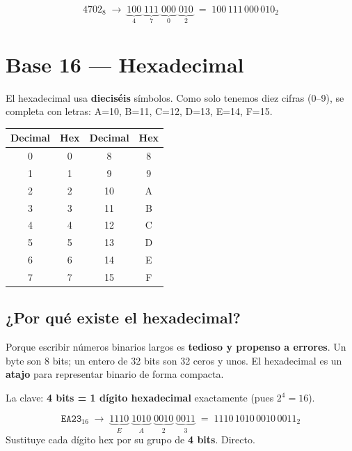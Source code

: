 \documentclass[12pt, oneside]{article}
\begin{document}
\begin{ejemplo}
\[
  4702_8
  \;\to\;
  \underbrace{100}_{4}\;
  \underbrace{111}_{7}\;
  \underbrace{000}_{0}\;
  \underbrace{010}_{2}
  \;=\; 100\,111\,000\,010_2
\]
\end{ejemplo}

\section{Base 16 — Hexadecimal}

El hexadecimal usa \textbf{dieciséis} símbolos.
Como solo tenemos diez cifras (0–9), se completa con letras: A=10, B=11,
C=12, D=13, E=14, F=15.

\begin{center}
\begin{tabular}{cccc}
  \toprule
  \textbf{Decimal} & \textbf{Hex} & \textbf{Decimal} & \textbf{Hex} \\
  \midrule
   0 & 0 &  8 & 8 \\
   1 & 1 &  9 & 9 \\
   2 & 2 & 10 & A \\
   3 & 3 & 11 & B \\
   4 & 4 & 12 & C \\
   5 & 5 & 13 & D \\
   6 & 6 & 14 & E \\
   7 & 7 & 15 & F \\
  \bottomrule
\end{tabular}
\end{center}

\subsection{¿Por qué existe el hexadecimal?}

Porque escribir números binarios largos es \textbf{tedioso y propenso a
errores}. Un byte son 8 bits; un entero de 32 bits son 32 ceros y unos.
El hexadecimal es un \textbf{atajo} para representar binario de forma compacta.

La clave: \textbf{4 bits = 1 dígito hexadecimal} exactamente (pues
$2^4 = 16$).

\begin{ejemplo}
\[
  \mathtt{EA23}_{16}
  \;\to\;
  \underbrace{1110}_{E}\;
  \underbrace{1010}_{A}\;
  \underbrace{0010}_{2}\;
  \underbrace{0011}_{3}
  \;=\; 1110\,1010\,0010\,0011_2
\]
Sustituye cada dígito hex por su grupo de \textbf{4 bits}. Directo.
\end{ejemplo}
\end{document}
